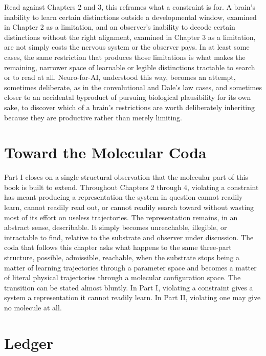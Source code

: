 \documentclass[11pt]{book}
\begin{document}
Read against Chapters 2 and 3, this reframes what a constraint is for. A brain's inability to learn certain distinctions outside a developmental window, examined in Chapter 2 as a limitation, and an observer's inability to decode certain distinctions without the right alignment, examined in Chapter 3 as a limitation, are not simply costs the nervous system or the observer pays. In at least some cases, the same restriction that produces those limitations is what makes the remaining, narrower space of learnable or legible distinctions tractable to search or to read at all. Neuro-for-AI, understood this way, becomes an attempt, sometimes deliberate, as in the convolutional and Dale's law cases, and sometimes closer to an accidental byproduct of pursuing biological plausibility for its own sake, to discover which of a brain's restrictions are worth deliberately inheriting because they are productive rather than merely limiting.

\section{Toward the Molecular Coda}

Part I closes on a single structural observation that the molecular part of this book is built to extend. Throughout Chapters 2 through 4, violating a constraint has meant producing a representation the system in question cannot readily learn, cannot readily read out, or cannot readily search toward without wasting most of its effort on useless trajectories. The representation remains, in an abstract sense, describable. It simply becomes unreachable, illegible, or intractable to find, relative to the substrate and observer under discussion. The coda that follows this chapter asks what happens to the same three-part structure, possible, admissible, reachable, when the substrate stops being a matter of learning trajectories through a parameter space and becomes a matter of literal physical trajectories through a molecular configuration space. The transition can be stated almost bluntly. In Part I, violating a constraint gives a system a representation it cannot readily learn. In Part II, violating one may give no molecule at all.

\section{Ledger}
\end{document}
